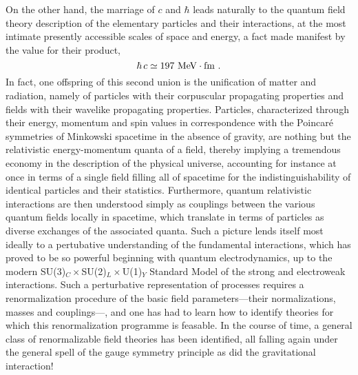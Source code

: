 \documentclass[a4paper,11pt]{article}
\begin{document}
On the other hand, the marriage of $c$ and $\hbar$ leads naturally to 
the quantum field theory description of the elementary particles and
their interactions, at the most intimate presently accessible scales of 
space and energy, a fact made manifest by the value for their product,
\begin{equation}
\hbar\,c\simeq 197\ {\rm MeV}\cdot{\rm fm}\ .
\end{equation}
In fact, one offspring of this second union is the unification of
matter and radiation, namely of particles with their corpuscular propagating
properties and fields with their wavelike propagating properties. Particles,
cha\-rac\-te\-ri\-zed through their energy, momentum and spin values 
in correspondence
with the Poincar\'e symmetries of Minkowski spacetime in the absence of 
gravity, are nothing but the relativistic energy-momentum quanta of a field,
thereby implying a tremendous economy in the description of the
physical universe, accounting for instance at once in terms of a single
field filling all of spacetime for the indistinguishability of identical 
particles and their statistics. Furthermore, quantum relativistic 
interactions are then understood simply as couplings between the various 
quantum fields locally in spacetime, which translate
in terms of particles as diverse exchanges of the associated quanta.
Such a picture lends itself most ideally to a pertubative understanding
of the fundamental interactions, which has proved to be so powerful
beginning with quantum elec\-tro\-dy\-na\-mics, up to the modern
SU(3)$_C\times$SU(2)$_L\times$U(1)$_Y$ Standard Model of the
strong and electroweak interactions. Such a perturbative representation
of processes requires a renormalization procedure of the basic field
parameters---their normalizations, masses and couplings---,
and one has had to learn how to identify theories for which this
renormalization programme is feasable. In the course of time, a general
class of renormalizable field theories has been identified, all falling
again under the general spell of the gauge symmetry principle as did the
gravitational interaction! 
\end{document}
